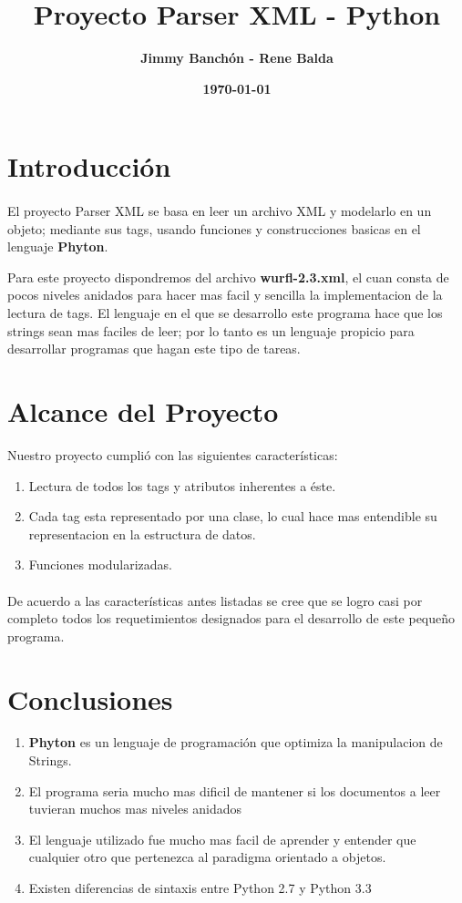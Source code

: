 \documentclass[11pt]{article}
\title{\textbf{Proyecto Parser XML - Python}}
\author{\textbf{Jimmy Banchón - Rene Balda}}
\date{\textbf{\today}}
\begin{document}


\maketitle
\section{\textbf{Introducción}} 
\paragraph{} \noindent
El proyecto Parser XML se basa en leer un archivo XML y modelarlo en un objeto; mediante sus tags, usando funciones y construcciones basicas en el lenguaje {\textbf{Phyton}}.

Para este proyecto dispondremos del archivo {\textbf{wurfl-2.3.xml}}, el cuan consta de pocos niveles anidados para hacer mas facil y sencilla la implementacion de la lectura de tags. El lenguaje en el que se desarrollo este programa hace que los strings sean mas faciles de leer; por lo tanto es un lenguaje propicio para desarrollar programas que hagan este tipo de tareas.
\section{\textbf{Alcance del Proyecto}}

Nuestro proyecto cumplió con las siguientes características:
\begin{enumerate}
\item 
Lectura de todos los tags y atributos inherentes a éste.

\item
Cada tag esta representado por una clase, lo cual hace mas entendible su representacion en la estructura de datos.

\item
Funciones modularizadas.

\end{enumerate}
\paragraph{} \noindent De acuerdo a las características antes listadas se cree que se logro casi por completo todos los requetimientos designados para el desarrollo de este pequeño programa.

\section{\textbf{Conclusiones}}
\begin{enumerate}
\item
{\textbf{Phyton}} es un lenguaje de programación que optimiza la manipulacion de Strings.
\item
El programa seria mucho mas dificil de mantener si los documentos a leer tuvieran muchos mas niveles anidados
\item
El lenguaje utilizado fue mucho mas facil de aprender y entender que cualquier otro que pertenezca al paradigma orientado a objetos.
\item
Existen diferencias de sintaxis entre Python 2.7 y Python 3.3

\end{enumerate}
\end{document}
